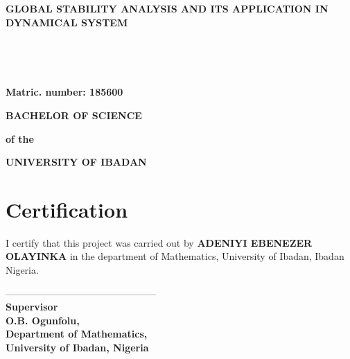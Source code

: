 \documentclass[a4paper,12pt]{report}
\numberwithin{equation}{section}
\begin{document}
\begin{center}
\textbf{GLOBAL STABILITY ANALYSIS AND ITS APPLICATION IN DYNAMICAL SYSTEM}
\end{center}
\ \
\begin{center}
\end{center}
\ \
\begin{center}
\end{center}
\begin{center}
\textbf{Matric. number: 185600}
\end{center}
\begin{center}
\end{center}
\begin{center}
\end{center}
\begin{center}
\end{center}
\begin{center}
\textbf{ BACHELOR OF SCIENCE}
\end{center}
\begin{center}
\textbf{of the}
\end{center}
\begin{center}
\textbf{UNIVERSITY OF IBADAN}
\end{center}
\begin{flushright}
\end{flushright}
\newpage
\addcontentsline{toc}{chapter}{Title Page}
\newpage
\section*{Certification} 
I certify that this project was carried out by {\bf ADENIYI EBENEZER OLAYINKA} in the department of Mathematics, University of Ibadan, Ibadan Nigeria.\\
\begin{center}
-----------------------------------------------\\
\textbf{Supervisor}\\
\textbf{O.B. Ogunfolu,}\\
\textbf{Department of Mathematics,}\\
\textbf{University of Ibadan, Nigeria} 
\end{center}
\newpage
\end{document}
